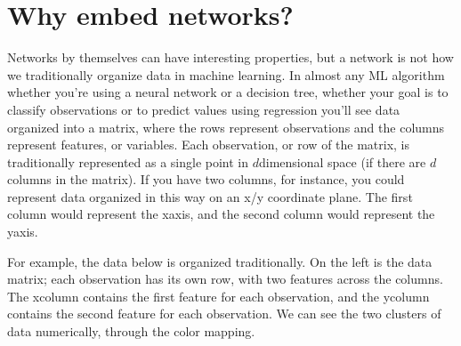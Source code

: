 \documentclass[letterpaper,10pt,english]{jupyterBook}
\begin{document}
\begin{sphinxVerbatim}[commandchars=\\\{\}]
  
        \PYG{p}{[}\PYG{p}{]}

\end{sphinxVerbatim}

\noindent{}


\section{Why embed networks?}
\label{\detokenize{representations/ch6/why-embed-networks:why-embed-networks}}\label{\detokenize{representations/ch6/why-embed-networks::doc}}
\sphinxAtStartPar
Networks by themselves can have interesting properties, but a network is not how we traditionally organize data in machine learning. In almost any ML algorithm \sphinxhyphen{} whether you’re using a neural network or a decision tree, whether your goal is to classify observations or to predict values using regression \sphinxhyphen{} you’ll see data organized into a matrix, where the rows represent observations and the columns represent features, or variables. Each observation, or row of the matrix, is traditionally represented as a single point in \(d\)\sphinxhyphen{}dimensional space (if there are \(d\) columns in the matrix). If you have two columns, for instance, you could represent data organized in this way on an x/y coordinate plane. The first column would represent the x\sphinxhyphen{}axis, and the second column would represent the y\sphinxhyphen{}axis.

\sphinxAtStartPar
For example, the data below is organized traditionally. On the left is the data matrix; each observation has its own row, with two features across the columns. The x\sphinxhyphen{}column contains the first feature for each observation, and the y\sphinxhyphen{}column contains the second feature for each observation. We can see the two clusters of data numerically, through the color mapping.
\end{document}

